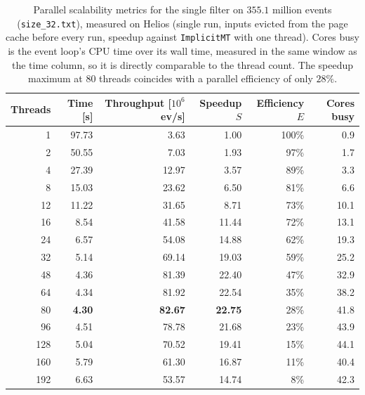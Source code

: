 \begin{table}[htbp]
\centering
\caption{Parallel scalability metrics for the single filter on $355.1$ million events (\texttt{size\_32.txt}), measured on Helios (single run, inputs evicted from the page cache before every run, speedup against \texttt{ImplicitMT} with one thread). Cores busy is the event loop's CPU time over its wall time, measured in the same window as the time column, so it is directly comparable to the thread count. The speedup maximum at 80 threads coincides with a parallel efficiency of only $28\%$.}
\label{tab:scalability-filter}
\begin{tabular}{rrrrrr}
\toprule
Threads & Time [s] & Throughput [$10^6$ ev/s] & Speedup $S$ & Efficiency $E$ & Cores busy \\
\midrule
 1 & 97.73 & 3.63 & 1.00 & 100\% & 0.9 \\
 2 & 50.55 & 7.03 & 1.93 & 97\% & 1.7 \\
 4 & 27.39 & 12.97 & 3.57 & 89\% & 3.3 \\
 8 & 15.03 & 23.62 & 6.50 & 81\% & 6.6 \\
12 & 11.22 & 31.65 & 8.71 & 73\% & 10.1 \\
16 & 8.54 & 41.58 & 11.44 & 72\% & 13.1 \\
24 & 6.57 & 54.08 & 14.88 & 62\% & 19.3 \\
32 & 5.14 & 69.14 & 19.03 & 59\% & 25.2 \\
48 & 4.36 & 81.39 & 22.40 & 47\% & 32.9 \\
64 & 4.34 & 81.92 & 22.54 & 35\% & 38.2 \\
80 & \textbf{4.30} & \textbf{82.67} & \textbf{22.75} & 28\% & 41.8 \\
96 & 4.51 & 78.78 & 21.68 & 23\% & 43.9 \\
128 & 5.04 & 70.52 & 19.41 & 15\% & 44.1 \\
160 & 5.79 & 61.30 & 16.87 & 11\% & 40.4 \\
192 & 6.63 & 53.57 & 14.74 & 8\% & 42.3 \\
\bottomrule
\end{tabular}
\end{table}
